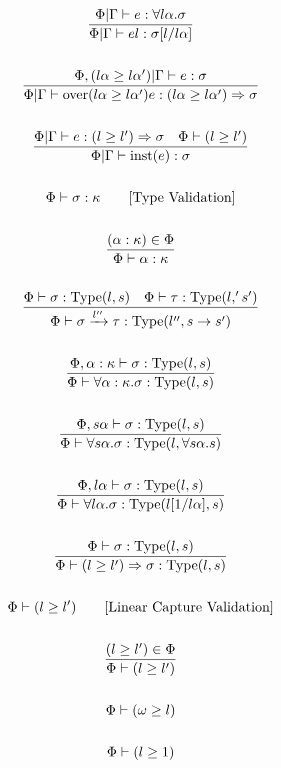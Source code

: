 \documentclass {article}
\begin{document}
\begin{gather*}
\\
\frac
{\Phi | \Gamma \vdash e : \forall l \alpha. \sigma }
{\Phi | \Gamma \vdash e l : \sigma [l/l \alpha]} \\
\\
\frac
{\Phi, (l\alpha \geq l\alpha') | \Gamma \vdash e : \sigma }
{\Phi | \Gamma \vdash \text{over} (l\alpha \geq l\alpha') e : (l\alpha \geq l\alpha') \Rightarrow \sigma } \\
\\
\frac
{\Phi | \Gamma \vdash e : (l \geq l') \Rightarrow \sigma \quad \Phi \vdash (l \geq l')}
{\Phi | \Gamma \vdash \text{inst} (e) : \sigma} \\
\\
\Phi \vdash \sigma : \kappa \tag* {[\text{Type Validation}]} \\
\\
\frac
{(\alpha : \kappa) \in \Phi}
{\Phi \vdash \alpha : \kappa} \\
\\
\frac
{\Phi \vdash \sigma : \text{Type} (l,s) \quad \Phi \vdash \tau : \text{Type} (l,'s')}
{\Phi \vdash \sigma \xrightarrow {l''} \tau : \text{Type} (l'',s \to s')} \\
\\
\frac
{\Phi, \alpha : \kappa \vdash \sigma : \text{Type}(l,s) }
{\Phi \vdash \forall \alpha : \kappa. \sigma : \text{Type} (l,s) } \\
\\
\frac
{\Phi, s \alpha \vdash \sigma : \text{Type} (l,s) }
{\Phi \vdash \forall s \alpha. \sigma : \text{Type} (l,\forall s \alpha. s) } \\
\\
\frac
{\Phi, l \alpha \vdash \sigma : \text {Type} (l,s) }
{\Phi \vdash \forall l \alpha. \sigma : \text{Type} (l[1/l\alpha],s) } \\
\\
\frac
{\Phi \vdash \sigma : \text{Type} (l,s) }
{\Phi \vdash (l \geq l') \Rightarrow \sigma : \text {Type} (l,s) } \\
\\
\Phi \vdash (l \geq l') \tag* {[\text{Linear Capture Validation}]} \\
\\
\frac
{(l \geq l') \in \Phi}
{\Phi \vdash (l \geq l') }\\
\\
\Phi \vdash (\omega \geq l) \\
\\
\Phi \vdash (l \geq 1) \\
\end{gather*}
\end{document}
